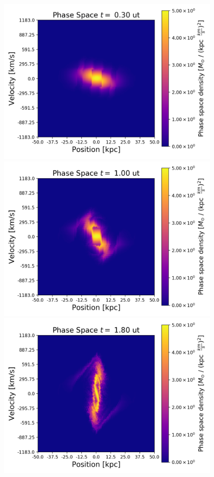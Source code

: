 \begin{figure}[h!]
    \centering
    \includegraphics[scale=0.45]{imag/2dBad3.png}
    \includegraphics[scale=0.45]{imag/2dBad10.png}
    \includegraphics[scale=0.45]{imag/2dBad18.png}

\end{figure}
